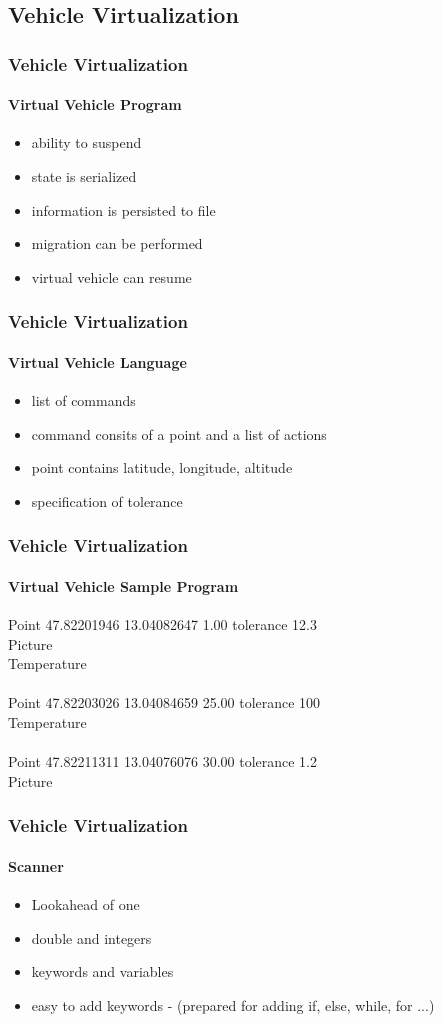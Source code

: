 \documentclass{beamer}
\begin{document}
\subsection{Vehicle Virtualization}

\begin{frame}\frametitle{Vehicle Virtualization}\framesubtitle{Virtual Vehicle Program}
\begin{itemize}
\item ability to suspend
\item state is serialized
\item information is persisted to file
\item migration can be performed
\item virtual vehicle can resume
\end{itemize} 
\end{frame}

\begin{frame}\frametitle{Vehicle Virtualization}\framesubtitle{Virtual Vehicle Language}
\begin{itemize}
\item list of commands
\item command consits of a point and a list of actions
\item point contains latitude, longitude, altitude
\item specification of tolerance
\end{itemize} 
\end{frame}

\begin{frame}\frametitle{Vehicle Virtualization}\framesubtitle{Virtual Vehicle Sample Program}
Point 47.82201946 13.04082647 1.00 tolerance 12.3\\
Picture \\
Temperature\\
\\
Point 47.82203026 13.04084659 25.00 tolerance 100 \\
Temperature\\
\\
Point 47.82211311 13.04076076 30.00 tolerance 1.2\\
Picture
\end{frame}

\begin{frame}\frametitle{Vehicle Virtualization}\framesubtitle{Scanner}
\begin{itemize}
\item Lookahead of one
\item double and integers
\item keywords and variables
\item easy to add keywords - (prepared for adding if, else, while, for ...)
\end{itemize} 
\end{frame}
\end{document}
